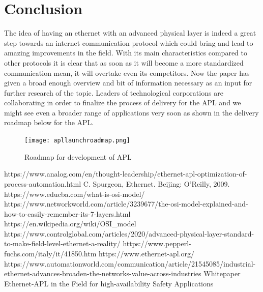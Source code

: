 \documentclass[conference]{IEEEtran}
\begin{document}
\section{Conclusion}
The idea of having an ethernet with an advanced physical layer is indeed a great step towards an internet communication protocol which could bring and lead to amazing improvements in the field. With its main characteristics compared to other protocols it is clear that as soon as it will become a more standardized communication mean, it will overtake even its competitors. Now the paper has given a broad enough overview and bit of information necessary as an input for further research of the topic. Leaders of technological corporations are collaborating in order to finalize the process of delivery for the APL and we might see even a broader range of applications very soon as shown in the delivery roadmap below for the APL.
\begin{figure}[htbp]
    \centerline{\texttt{[image: apllaunchroadmap.png]}}
    \caption{Roadmap for development of APL \cite{b8}}
    \label{rmapl}
\end{figure}



\begin{thebibliography}{00}
 https://www.analog.com/en/thought-leadership/ethernet-apl-optimization-of-process-automation.html
 C. Spurgeon, Ethernet. Beijing: O'Reilly, 2009.
 https://www.educba.com/what-is-osi-model/
 https://www.networkworld.com/article/3239677/the-osi-model-explained-and-how-to-easily-remember-its-7-layers.html
 https://en.wikipedia.org/wiki/OSI\_model
 https://www.controlglobal.com/articles/2020/advanced-physical-layer-standard-to-make-field-level-ethernet-a-reality/
 https://www.pepperl-fuchs.com/italy/it/41850.htm
 https://www.ethernet-apl.org/
 https://www.automationworld.com/communication/article/21545085/industrial-ethernet-advances-broaden-the-networks-value-across-industries
 Whitepaper Ethernet-APL in the Field for
high-availability Safety Applications
\end{thebibliography}
\end{document}
